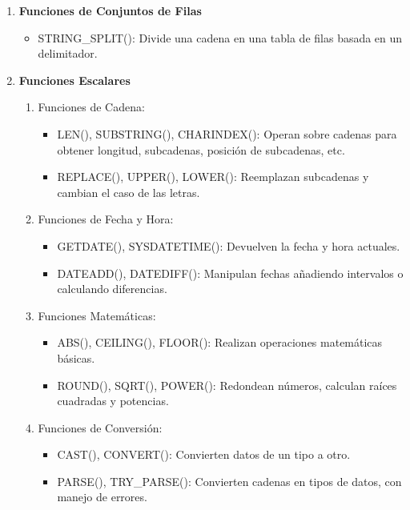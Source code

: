 \documentclass[a4paper,openany,11pt]{article}
\begin{document}
\begin{enumerate}
    \item{\textbf{Funciones de Conjuntos de Filas}}
    \begin{itemize}
        \item STRING\_SPLIT(): Divide una cadena en una tabla de filas basada en un
            delimitador.
    \end{itemize}

    \item{\textbf{Funciones Escalares}}

    \begin{enumerate}
        \item Funciones de Cadena:
        \begin{itemize}
            \item LEN(), SUBSTRING(), CHARINDEX(): Operan sobre cadenas
                para obtener longitud, subcadenas, posición de subcadenas,
                etc.
            \item REPLACE(), UPPER(), LOWER(): Reemplazan subcadenas y
                cambian el caso de las letras.
        \end{itemize}

        \item Funciones de Fecha y Hora:
        \begin{itemize}
            \item GETDATE(), SYSDATETIME(): Devuelven la fecha y hora actuales.
            \item DATEADD(), DATEDIFF(): Manipulan fechas añadiendo intervalos
                o calculando diferencias.
        \end{itemize}

        \item Funciones Matemáticas:
        \begin{itemize}
            \item ABS(), CEILING(), FLOOR(): Realizan operaciones matemáticas
                básicas.
            \item ROUND(), SQRT(), POWER(): Redondean números, calculan raíces
                cuadradas y potencias.
        \end{itemize}

        \item Funciones de Conversión:
        \begin{itemize}
            \item CAST(), CONVERT(): Convierten datos de un tipo a otro.
            \item PARSE(), TRY\_PARSE(): Convierten cadenas en tipos de datos, con manejo de errores.
        \end{itemize}


\end{enumerate}
\end{enumerate}
\end{document}
